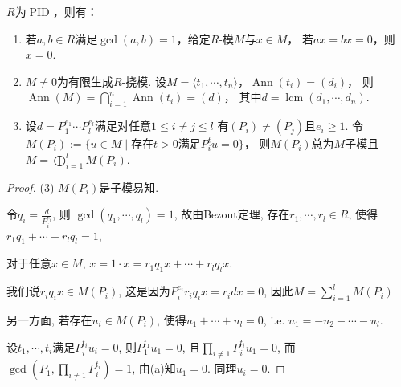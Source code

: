     \begin{theorem}
        $R$为$\operatorname{PID}$，则有：
        \begin{enumerate}[label=(\arabic*)]
        \item 若$a,b \in R$满足$\gcd(a,b)=1$，给定$R$-模$M$与$x\in M$，
        若$ax=bx=0$，则$x=0$.
        \item $M\neq 0$为有限生成$R$-挠模. 
        设$M=\langle t_1,\cdots,t_n\rangle$，$\operatorname{Ann}(t_i)=(d_i)$，
        则$\operatorname{Ann}(M)=\bigcap\limits_{i=1}^n\operatorname{Ann}(t_i)=(d)$，
        其中$d=\operatorname{lcm}(d_1,\cdots,d_n)$.
        \item 设$d=P_1^{e_1}\cdots P_l^{e_l}$满足对任意$1 \leq i\neq j\leq l$
        有$(P_i)\neq (P_j)$且$e_i\geq 1$. 
        令$M(P_i):=\{u\in M\mid$存在$t>0$满足$P_i^tu=0\}$，
        则$M(P_i)$总为$M$子模且$M=\bigoplus\limits_{i=1}^l M(P_i)$.
        \end{enumerate}
    \end{theorem}
    \begin{proof}
        (3) $M(P_i)$是子模易知.\par
        \qquad 令$q_i=\frac{d}{P_i^{e_i}}$, 则
        $\operatorname{gcd}(q_1,\cdots,q_l)=1$, 故由Bezout定理, 
        存在$r_1,\cdots,r_l \in R$, 使得$r_1q_1+\cdots+r_lq_l=1$,\par
        \qquad 对于任意$x\in M$, $x=1\cdot x=r_1q_1x+\cdots+r_lq_l x$.\par
        \qquad 我们说$r_iq_ix\in M(P_i)$, 这是因为$P_i^{e_i}r_iq_ix=r_i dx=0$, 
        因此$M=\sum\limits_{i=1}^l M(P_i)$\par
        \qquad 另一方面, 若存在$u_i\in M(P_i)$, 使得$u_1+\cdots+u_l=0$, 
        i.e. $u_1=-u_2-\cdots-u_l$.\par
        \qquad 设$t_1,\cdots,t_i$满足$P_i^{t_i}u_i=0$, 则$P_1^{t_1}u_1=0$, 
        且$\prod\limits_{i\neq 1}P_i^{t_i}u_1=0$, 
        而$\operatorname{gcd}(P_1,\prod\limits_{i\neq 1}P_i^{t_i})=1$, 
        由(a)知$u_1=0$. 同理$u_i=0$.
    \end{proof}
